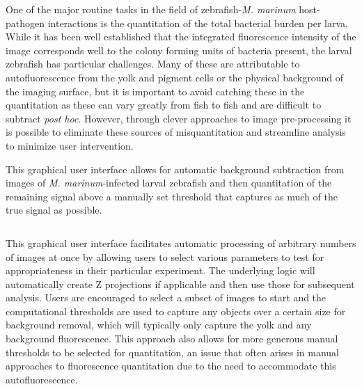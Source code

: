 One of the major routine tasks in the field of zebrafish-\textit{M. marinum} host-pathogen interactions is the quantitation of the total bacterial burden per larva. While it has been well established that the integrated fluorescence intensity of the image corresponds well to the colony forming units of bacteria present, the larval zebrafish has particular challenges. Many of these are attributable to autofluorescence from the yolk and pigment cells or the physical background of the imaging surface, but it is important to avoid catching these in the quantitation as these can vary greatly from fish to fish and are difficult to subtract \textit{post hoc}. However, through clever approaches to image pre-processing it is possible to eliminate these sources of misquantitation and streamline analysis to minimize user intervention.

\begin{code}
\caption{This graphical user interface allows for automatic background subtraction from images of \textit{M. marinum}-infected larval zebrafish and then quantitation of the remaining signal above a manually set threshold that captures as much of the true signal as possible.}
\label{burden}

\inputminted[breaklines,frame=single]{python}{source/burdenMeasurer.py}

\end{code}

This graphical user interface facilitates automatic processing of arbitrary numbers of images at once by allowing users to select various parameters to test for appropriateness in their particular experiment. The underlying logic will automatically create Z projections if applicable and then use those for subsequent analysis. Users are encouraged to select a subset of images to start and the computational thresholds are used to capture any objects over a certain size for background removal, which will typically only capture the yolk and any background fluorescence. This approach also allows for more generous manual thresholds to be selected for quantitation, an issue that often arises in manual approaches to fluorescence quantitation due to the need to accommodate this autofluorescence. 

